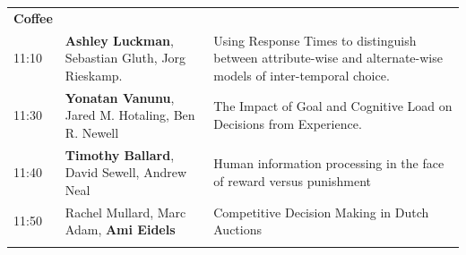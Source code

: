 \documentclass[]{article}
\begin{document}
\begin{longtable}[]{@{}lll@{}}
\begin{minipage}[t]{0.51\columnwidth}
\textbf{Coffee}\strut
\end{minipage}\tabularnewline
\begin{minipage}[t]{0.03\columnwidth}\raggedright\strut
11:10\strut
\end{minipage} & \begin{minipage}[t]{0.38\columnwidth}\raggedright\strut
\textbf{Ashley Luckman}, Sebastian Gluth, Jorg Rieskamp.\strut
\end{minipage} & \begin{minipage}[t]{0.51\columnwidth}\raggedright\strut
Using Response Times to distinguish between attribute-wise and
alternate-wise models of inter-temporal choice.\strut
\end{minipage}\tabularnewline
\begin{minipage}[t]{0.03\columnwidth}\raggedright\strut
11:30\strut
\end{minipage} & \begin{minipage}[t]{0.38\columnwidth}\raggedright\strut
\textbf{Yonatan Vanunu}, Jared M. Hotaling, Ben R. Newell\strut
\end{minipage} & \begin{minipage}[t]{0.51\columnwidth}\raggedright\strut
The Impact of Goal and Cognitive Load on Decisions from
Experience.\strut
\end{minipage}\tabularnewline
\begin{minipage}[t]{0.03\columnwidth}\raggedright\strut
11:40\strut
\end{minipage} & \begin{minipage}[t]{0.38\columnwidth}\raggedright\strut
\textbf{Timothy Ballard}, David Sewell, Andrew Neal\strut
\end{minipage} & \begin{minipage}[t]{0.51\columnwidth}\raggedright\strut
Human information processing in the face of reward versus
punishment\strut
\end{minipage}\tabularnewline
\begin{minipage}[t]{0.03\columnwidth}\raggedright\strut
11:50\strut
\end{minipage} & \begin{minipage}[t]{0.38\columnwidth}\raggedright\strut
Rachel Mullard, Marc Adam, \textbf{Ami Eidels}\strut
\end{minipage} & \begin{minipage}[t]{0.51\columnwidth}\raggedright\strut
Competitive Decision Making in Dutch Auctions\strut
\end{minipage}\tabularnewline
\begin{minipage}[t]{0.03\columnwidth}\raggedright\strut

\end{minipage}
\end{longtable}
\end{document}
